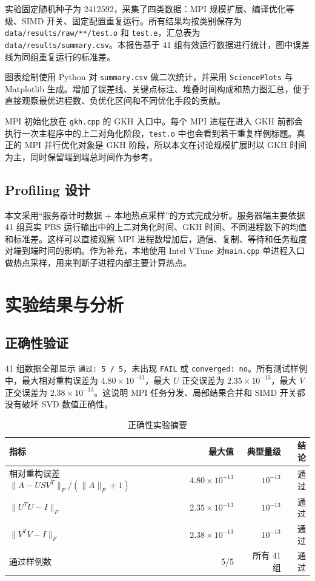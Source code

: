 \documentclass[UTF8,a4paper,10pt,fontset=windows]{ctexart}
\begin{document}
实验固定随机种子为 2412592，采集了四类数据：MPI 规模扩展、编译优化等级、SIMD 开关、固定配置重复运行。所有结果均按类别保存为 \texttt{data/results/raw/**/test.o} 和 \texttt{test.e}，汇总表为 \texttt{data/results/summary.csv}。本报告基于 41 组有效运行数据进行统计，图中误差线为同组重复运行的标准差。

图表绘制使用 Python 对 \texttt{summary.csv} 做二次统计，并采用 \texttt{SciencePlots} 与 Matplotlib 生成。增加了误差线、关键点标注、堆叠时间构成和热力图汇总，便于直接观察最优进程数、负优化区间和不同优化手段的贡献。

MPI 初始化放在 \texttt{gkh.cpp} 的 GKH 入口中。每个 MPI 进程在进入 GKH 前都会执行一次主程序中的上二对角化阶段，\texttt{test.o} 中也会看到若干重复样例标题。真正的 MPI 并行优化对象是 GKH 阶段，所以本文在讨论规模扩展时以 GKH 时间为主，同时保留端到端总时间作为参考。

\subsection{Profiling 设计}
本文采用“服务器计时数据 + 本地热点采样”的方式完成分析。服务器端主要依据 41 组真实 PBS 运行输出中的上二对角化时间、GKH 时间、不同进程数下的均值和标准差。这样可以直接观察 MPI 进程数增加后，通信、复制、等待和任务粒度对端到端时间的影响。作为补充，本地使用 Intel VTune 对\texttt{main.cpp} 单进程入口做热点采样，用来判断子进程内部主要计算热点。


\section{实验结果与分析}

\subsection{正确性验证}
41 组数据全部显示 \texttt{通过: 5 / 5}，未出现 \texttt{FAIL} 或 \texttt{converged: no}。所有测试样例中，最大相对重构误差为 $4.80\times10^{-13}$，最大 $U$ 正交误差为 $2.35\times10^{-13}$，最大 $V$ 正交误差为 $2.38\times10^{-13}$。这说明 MPI 任务分发、局部结果合并和 SIMD 开关都没有破坏 SVD 数值正确性。

\begin{table}[H]
\centering
\begin{tabular}{lrrr}
\toprule
指标 & 最大值 & 典型量级 & 结论\\
\midrule
相对重构误差 $\|A-USV^T\|_F/(\|A\|_F+1)$ & $4.80\times10^{-13}$ & $10^{-13}$ & 通过\\
$\|U^TU-I\|_F$ & $2.35\times10^{-13}$ & $10^{-13}$ & 通过\\
$\|V^TV-I\|_F$ & $2.38\times10^{-13}$ & $10^{-13}$ & 通过\\
通过样例数 & 5/5 & 所有 41 组 & 通过\\
\bottomrule
\end{tabular}
\caption{正确性实验摘要}
\label{tab:correctness}
\end{table}
\end{document}
